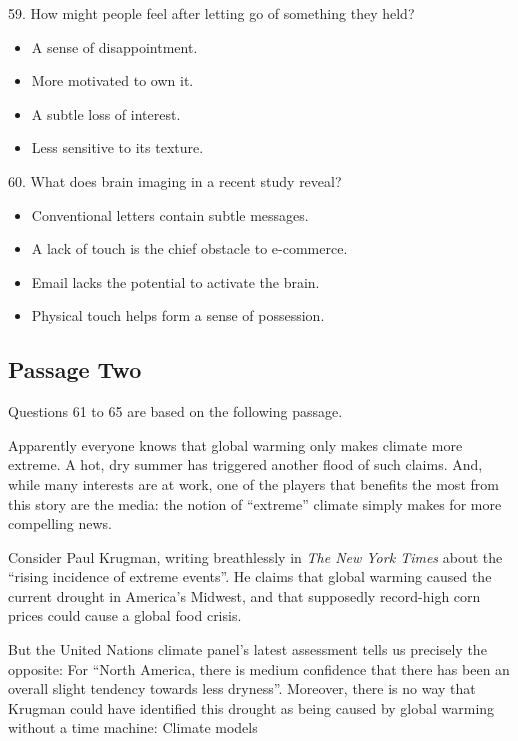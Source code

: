 \documentclass[UTF8,11pt]{ctexart}
\begin{document}
59. How might people feel after letting go of something they held?


\begin{itemize}[leftmargin=2em,itemsep=.2em,topsep=.4em]\item[A.] A sense of disappointment.
\item[B.] More motivated to own it.
\item[C.] A subtle loss of interest.
\item[D.] Less sensitive to its texture.
\end{itemize}

60. What does brain imaging in a recent study reveal?


\begin{itemize}[leftmargin=2em,itemsep=.2em,topsep=.4em]\item[A.] Conventional letters contain subtle messages.
\item[B.] A lack of touch is the chief obstacle to e-commerce.
\item[C.] Email lacks the potential to activate the brain.
\item[D.] Physical touch helps form a sense of possession.
\end{itemize}

\subsection*{Passage Two}


Questions 61 to 65 are based on the following passage.


Apparently everyone knows that global warming only makes climate more extreme. A hot, dry summer has triggered another flood of such claims. And, while many interests are at work, one of the players that benefits the most from this story are the media: the notion of “extreme” climate simply makes for more compelling news.


Consider Paul Krugman, writing breathlessly in\textit{ The New York Times} about the “rising incidence of extreme events”. He claims that global warming caused the current drought in America’s Midwest, and that supposedly record-high corn prices could cause a global food crisis.


But the United Nations climate panel’s latest assessment tells us precisely the opposite: For “North America, there is medium confidence that there has been an overall slight tendency towards less dryness”. Moreover, there is no way that Krugman could have identified this drought as being caused by global warming without a time machine: Climate models
\end{document}
